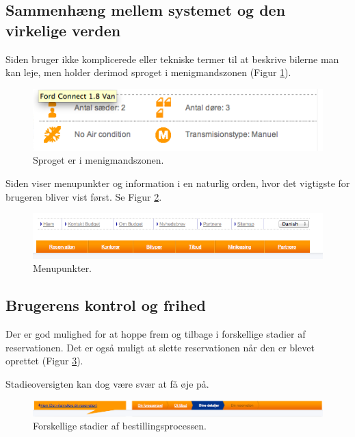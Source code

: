 \documentclass[a4paper]{article}
\begin{document}
\subsection{Sammenhæng mellem systemet og den virkelige verden}
Siden bruger ikke komplicerede eller tekniske termer til at beskrive bilerne man
kan leje, men holder derimod sproget i menigmandszonen (Figur \ref{sprog}).

\begin{figure}[htbp]
  \begin{center}
    \includegraphics[scale=.6]{5.png}
  \end{center}
  \caption{Sproget er i menigmandszonen.}
  \label{sprog}
\end{figure}

Siden viser menupunkter og information i en naturlig orden, hvor det vigtigste
for brugeren bliver vist først. Se Figur \ref{menu}.

\begin{figure}[htbp]
  \begin{center}
    \includegraphics[width=\textwidth]{2.png}
  \end{center}
  \caption{Menupunkter.}
  \label{menu}
\end{figure}

\subsection{Brugerens kontrol og frihed}
Der er god mulighed for at hoppe frem og tilbage i forskellige stadier af
reservationen. Det er også muligt at slette reservationen når den er blevet
oprettet (Figur \ref{stadier}).

Stadieoversigten kan dog være svær at få øje på.
\begin{figure}[htbp]
  \begin{center}
    \includegraphics[width=\textwidth]{9.png}
  \end{center}
  \caption{Forskellige stadier af bestillingsprocessen.}
  \label{stadier}
\end{figure}
\end{document}

